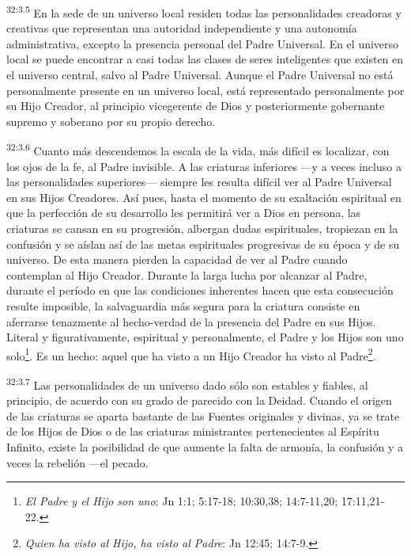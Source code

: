 \par
\textsuperscript{32:3.5} En la sede de un universo local residen todas las personalidades creadoras y creativas que representan una autoridad independiente y una autonomía administrativa, excepto la presencia personal del Padre Universal. En el universo local se puede encontrar a casi todas las clases de seres inteligentes que existen en el universo central, salvo al Padre Universal. Aunque el Padre Universal no está personalmente presente en un universo local, está representado personalmente por su Hijo Creador, al principio vicegerente de Dios y posteriormente gobernante supremo y soberano por su propio derecho.

\par
\textsuperscript{32:3.6} Cuanto más descendemos la escala de la vida, más difícil es localizar, con los ojos de la fe, al Padre invisible. A las criaturas inferiores ---y a veces incluso a las personalidades superiores--- siempre les resulta difícil ver al Padre Universal en sus Hijos Creadores. Así pues, hasta el momento de su exaltación espiritual en que la perfección de su desarrollo les permitirá ver a Dios en persona, las criaturas se cansan en su progresión, albergan dudas espirituales, tropiezan en la confusión y se aíslan así de las metas espirituales progresivas de su época y de su universo. De esta manera pierden la capacidad de ver al Padre cuando contemplan al Hijo Creador. Durante la larga lucha por alcanzar al Padre, durante el período en que las condiciones inherentes hacen que esta consecución resulte imposible, la salvaguardia más segura para la criatura consiste en aferrarse tenazmente al hecho-verdad de la presencia del Padre en sus Hijos. Literal y figurativamente, espiritual y personalmente, el Padre y los Hijos son uno solo\footnote{\textit{El Padre y el Hijo son uno}: Jn 1:1; 5:17-18; 10:30,38; 14:7-11,20; 17:11,21-22.}. Es un hecho: aquel que ha visto a un Hijo Creador ha visto al Padre\footnote{\textit{Quien ha visto al Hijo, ha visto al Padre}: Jn 12:45; 14:7-9.}.

\par
\textsuperscript{32:3.7} Las personalidades de un universo dado sólo son estables y fiables, al principio, de acuerdo con su grado de parecido con la Deidad. Cuando el origen de las criaturas se aparta bastante de las Fuentes originales y divinas, ya se trate de los Hijos de Dios o de las criaturas ministrantes pertenecientes al Espíritu Infinito, existe la posibilidad de que aumente la falta de armonía, la confusión y a veces la rebelión ---el pecado.

